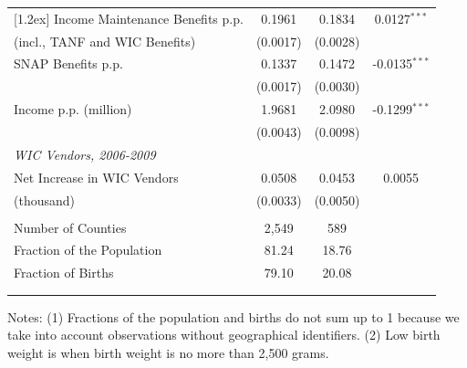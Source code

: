 \begin{table}[!htbp]
\begin{center}
\begin{tabular}{@{\extracolsep{0pt}}lccc }
			[1.2ex]
			\hspace{12pt} Income Maintenance Benefits p.p. & 0.1961 & 0.1834 & 0.0127$^{***}$ \\ 
			\hspace{24pt} (incl., TANF and WIC Benefits)   & (0.0017) & (0.0028) & \\  
			[1.2ex]
			\hspace{12pt} SNAP Benefits p.p. & 0.1337 & 0.1472 & -0.0135$^{***}$ \\ 
			& (0.0017) & (0.0030) & \\ 
			[1.2ex]
			\hspace{12pt} Income p.p. (million) & 1.9681 & 2.0980 & -0.1299$^{***}$ \\ 
			& (0.0043) & (0.0098) & \\
			[1.2ex]
			\multicolumn{3}{l}{\textit{WIC Vendors, 2006-2009}} & \\ 
			[1.2ex]
			\hspace{12pt} Net Increase in WIC Vendors & 0.0508 & 0.0453 & 0.0055 \\ 
			\hspace{24pt} (thousand) & (0.0033) & (0.0050) & \\
			& &  &\\
			Number of Counties & 2,549 & 589 & \\ 
			Fraction of the Population & 81.24 & 18.76 &\\ 
			Fraction of Births & 	79.10 & 20.08 & \\ 
			\hline \\[-1.8ex] 
			\hline 
			\hline \\  [-5.0ex] 
		\end{tabular} 
	\end{center}
	\footnotesize
	Notes: (1) Fractions of the population and births do not sum up to 1 because we take into account observations without geographical identifiers. (2) Low birth weight is when birth weight is no more than 2,500 grams.
\end{table} 


